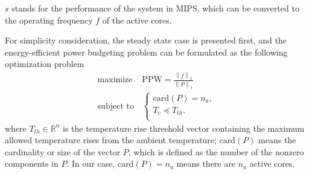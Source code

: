 $s$ stands for the performance of the system in MIPS, which can be converted to the operating frequency $f$ of the active cores.

For simplicity consideration, the steady state case is presented first, and the energy-efficient power budgeting problem can be formulated as the following optimization problem
\begin{equation}\label{eq:opt_ppw}
\begin{split}
\text{maximize } & \text{PPW} = \frac{\left \| f \right \|_{1}}{\left \| P \right \|_{1}}\\
\text{subject to} &\left\{
\begin{array}{lr}
\text{card}(P) = n_{a},\\
T_{c} \preceq T_{th}.\\
\end{array}
\right.
\end{split}
\end{equation}
where $T_{th} \in \mathbb{R}^{n}$ is the temperature rise threshold vector containing the maximum allowed temperature rises from the ambient temperature; card$(P)$ means the cardinality or size of the vector $P$, which is defined as the number of the nonzero components in $P$. In our case, card$(P) = n_{a}$ means there are $n_{a}$ active cores.



